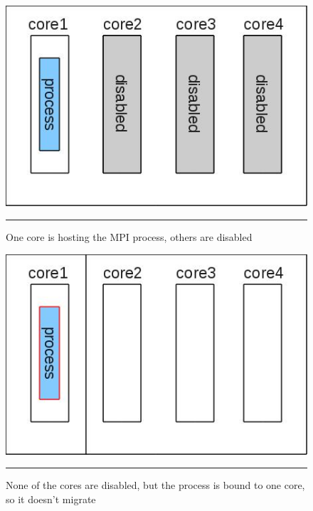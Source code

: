 \begin{figure}[htbp]
  \centering
    \includegraphics[scale=0.4]{./Figures/disabled_cores.jpg}
    \rule{35em}{0.5pt}
  \caption[Disabled cores]{One core is hosting the MPI process, others are disabled}
  \label{fig:disabled_cores}
\end{figure}
\begin{figure}[htbp]
  \centering
    \includegraphics[scale=0.4]{./Figures/bind_to_core.jpg}
    \rule{35em}{0.5pt}
  \caption[Core binding]{None of the cores are disabled, but the
    process is bound to one core, so it doesn't migrate}
  \label{fig:core_binding}
\end{figure}
